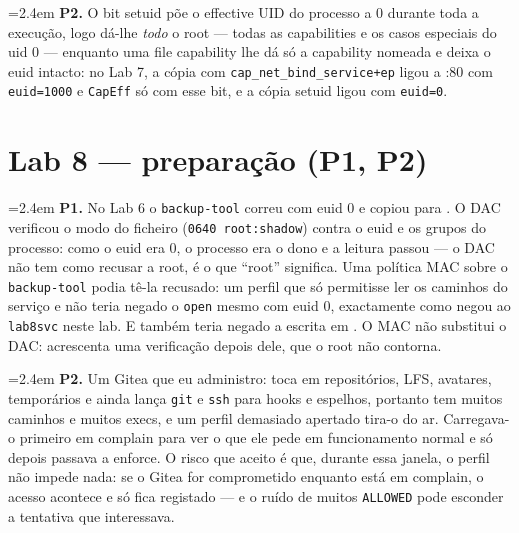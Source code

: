 \documentclass[a4paper,11pt]{article}
\newenvironment{answer}[1]{%
  \par\addvspace{7pt}\noindent
  \hangindent=2.4em\hangafter=1
  {\color{sscnblue}\bfseries #1\hspace{0.55em}}\ignorespaces}
  {\par\addvspace{5pt}}
\newcommand{\cmd}[1]{\textcolor{sscnblue}{\texttt{#1}}}
\newcommand{\file}[1]{\texttt{\detokenize{#1}}}
\begin{document}
\begin{answer}{P2.}
O bit setuid p\~oe o effective UID do processo a 0 durante toda a execu\c{c}\~ao, logo
d\'a-lhe \emph{todo} o root --- todas as capabilities e os casos especiais do uid 0 ---
enquanto uma file capability lhe d\'a s\'o a capability nomeada e deixa o euid intacto:
no Lab 7, a c\'opia com \cmd{cap\_net\_bind\_service+ep} ligou a :80 com
\cmd{euid=1000} e \cmd{CapEff} s\'o com esse bit, e a c\'opia setuid ligou com
\cmd{euid=0}.
\end{answer}

\section{Lab 8 --- prepara\c{c}\~ao (P1, P2)}

\begin{answer}{P1.}
No Lab 6 o \cmd{backup-tool} correu com euid 0 e copiou \file{/etc/shadow} para
\file{/tmp/leak}. O DAC verificou o modo do ficheiro (\cmd{0640 root:shadow}) contra o
euid e os grupos do processo: como o euid era 0, o processo era o dono e a leitura
passou --- o DAC n\~ao tem como recusar a root, \'e o que ``root'' significa. Uma
pol\'itica MAC sobre o \cmd{backup-tool} podia t\^e-la recusado: um perfil que s\'o
permitisse ler os caminhos do servi\c{c}o e n\~ao \file{/etc/shadow} teria negado o
\cmd{open} mesmo com euid 0, exactamente como negou ao \cmd{lab8svc} neste lab. E
tamb\'em teria negado a escrita em \file{/root}. O MAC n\~ao substitui o DAC: acrescenta
uma verifica\c{c}\~ao depois dele, que o root n\~ao contorna.
\end{answer}

\begin{answer}{P2.}
Um Gitea que eu administro: toca em reposit\'orios, LFS, avatares, tempor\'arios e
ainda lan\c{c}a \cmd{git} e \cmd{ssh} para hooks e espelhos, portanto tem muitos
caminhos e muitos execs, e um perfil demasiado apertado tira-o do ar. Carregava-o
primeiro em complain para ver o que ele pede em funcionamento normal e s\'o depois
passava a enforce. O risco que aceito \'e que, durante essa janela, o perfil n\~ao
impede nada: se o Gitea for comprometido enquanto est\'a em complain, o acesso
acontece e s\'o fica registado --- e o ru\'ido de muitos \cmd{ALLOWED} pode esconder
a tentativa que interessava.
\end{answer}

\end{document}
